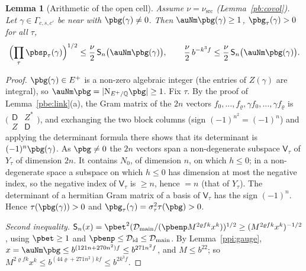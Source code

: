 \documentclass[10pt]{amsart}
\newtheorem{lemma}[theorem]{Lemma}
\theoremstyle{definition}
\theoremstyle{remark}
\newcommand{\Z}{\mathbb Z}
\newcommand{\Q}{\mathbb Q}
\providecommand{\pbDid}{\mathcal D_{\mathrm{id}}}
\providecommand{\pbDmain}{\mathcal D_{\mathrm{main}}}
\begin{document}
\begin{lemma}[Arithmetic of the open cell]\label{pbs:open-arith}
Assume $\nu=\nu_{\mathrm{src}}$ (Lemma~\ref{pb:covol}). Let $\gamma\in\Gamma_{c,s,c'}$ be near with $\pbg(\gamma)
\ne0$. Then $\auNm\pbg(\gamma)\ge1$, $\pbg_\tau(\gamma)>0$ for all $\tau$,
\[
\Bigl(\prod_\tau\pbsp_\tau(\gamma)\Bigr)^{1/2}\le\frac\nu2\,\mathsf S_n\bigl(\auNm\pbg(\gamma)\bigr),
\qquad\frac\nu2\,b^{-k^3f}\le\frac\nu2\,\mathsf S_n\bigl(\auNm\pbg(\gamma)\bigr).
\]
\end{lemma}
\begin{proof}
$\pbg(\gamma)\in E^+$ is a non-zero algebraic integer (the entries of $Z(\gamma)$ are integral), so
$\auNm\pbg=|\mathrm N_{E^+/\Q}\pbg|\ge1$. Fix $\tau$. By the proof of Lemma~\ref{pbe:link}(a), the Gram
matrix of the $2n$ vectors $f_0,\dots,f_\varrho,\gamma f_0,\dots,\gamma f_\varrho$ is $\bigl(\begin{smallmatrix}
\mathsf D&Z^*\\Z&\mathsf D\end{smallmatrix}\bigr)$, and exchanging the two block columns (sign $(-1)^{n^2}
=(-1)^n$) and applying the determinant formula there shows that its determinant is $(-1)^n\pbg(\gamma)$.
As $\pbg\ne0$ the $2n$ vectors span a non-degenerate subspace $\mathsf V_\tau$ of $Y_\tau$ of dimension $2n$.
It contains $N_0$, of dimension $n$, on which $h\le0$; in a non-degenerate space a subspace on which
$h\le0$ has dimension at most the negative index, so the negative index of $\mathsf V_\tau$ is $\ge n$,
hence $=n$ (that of $Y_\tau$). The determinant of a hermitian Gram matrix of a basis of $\mathsf V_\tau$
has the sign $(-1)^n$. Hence $\tau(\pbg(\gamma))>0$ and $\pbg_\tau(\gamma)=\sigma_\tau^2\tau(\pbg)>0$.

\emph{Second inequality.} $\mathsf S_n(x)=\pbet^2(\pbDmain/(\pbenp M^{2\varrho fk}x^k))^{1/2}\ge(M^{2\varrho fk}x^k)
^{-1/2}$, using $\pbet\ge1$ and $\pbenp\le\pbDid\le\pbDmain$. By Lemma~\ref{ppi:gauge}, $x=\auNm\pbg\le
b^{(121n+270n^2)f}\le b^{271n^2f}$, and $M\le b^{22}$; so $M^{2\varrho fk}x^k\le b^{(44\varrho+271n^2)kf}\le
b^{2k^3f}$.


\end{proof}
\end{document}
